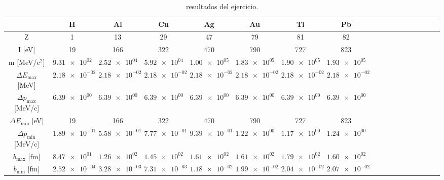 \begin{table}
\caption{resultados del ejercicio.}
\label{Tab:02-ex03}
\begin{tabular}{cccccccccccccccccc}
\toprule
 & H & Al & Cu & Ag & Au & Tl & Pb \\
\midrule
Z & 1 & 13 & 29 & 47 & 79 & 81 & 82 \\
I [eV] & 19 & 166 & 322 & 470 & 790 & 727 & 823 \\
m [MeV/c$^2$] & $\SI{9.31e+02}{}$ & $\SI{2.52e+04}{}$ & $\SI{5.92e+04}{}$ & $\SI{1.00e+05}{}$ & $\SI{1.83e+05}{}$ & $\SI{1.90e+05}{}$ & $\SI{1.93e+05}{}$ \\
$\Delta E_{\max}$ [MeV] & $\SI{2.18e-02}{}$ & $\SI{2.18e-02}{}$ & $\SI{2.18e-02}{}$ & $\SI{2.18e-02}{}$ & $\SI{2.18e-02}{}$ & $\SI{2.18e-02}{}$ & $\SI{2.18e-02}{}$ \\
$\Delta p_{\max}$ [MeV/c] & $\SI{6.39e+00}{}$ & $\SI{6.39e+00}{}$ & $\SI{6.39e+00}{}$ & $\SI{6.39e+00}{}$ & $\SI{6.39e+00}{}$ & $\SI{6.39e+00}{}$ & $\SI{6.39e+00}{}$ \\
$\Delta E_{\min}$ [eV] & 19 & 166 & 322 & 470 & 790 & 727 & 823 \\
$\Delta p_{\min}$ [MeV/c] & $\SI{1.89e-01}{}$ & $\SI{5.58e-01}{}$ & $\SI{7.77e-01}{}$ & $\SI{9.39e-01}{}$ & $\SI{1.22e+00}{}$ & $\SI{1.17e+00}{}$ & $\SI{1.24e+00}{}$ \\
$b_{\max}$ [fm] & $\SI{8.47e+01}{}$ & $\SI{1.26e+02}{}$ & $\SI{1.45e+02}{}$ & $\SI{1.61e+02}{}$ & $\SI{1.61e+02}{}$ & $\SI{1.79e+02}{}$ & $\SI{1.60e+02}{}$ \\
$b_{\min}$ [fm] & $\SI{2.52e-04}{}$ & $\SI{3.28e-03}{}$ & $\SI{7.31e-03}{}$ & $\SI{1.18e-02}{}$ & $\SI{1.99e-02}{}$ & $\SI{2.04e-02}{}$ & $\SI{2.07e-02}{}$ \\
\bottomrule
\end{tabular}
\end{table}
